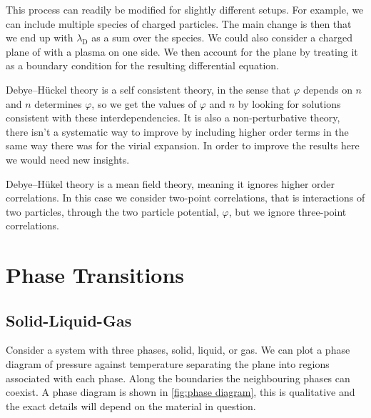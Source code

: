 \documentclass[fleqn]{NotesClass}
\begin{document}
    This process can readily be modified for slightly different setups.
    For example, we can include multiple species of charged particles.
    The main change is then that we end up with \(\lambda_{\mathrm{D}}\) as a sum over the species.
    We could also consider a charged plane of with a plasma on one side.
    We then account for the plane by treating it as a boundary condition for the resulting differential equation.
    
    Debye--H\"uckel theory is a self consistent theory, in the sense that \(\varphi\) depends on \(n\) and \(n\) determines \(\varphi\), so we get the values of \(\varphi\) and \(n\) by looking for solutions consistent with these interdependencies.
    It is also a non-perturbative theory, there isn't a systematic way to improve by including higher order terms in the same way there was for the virial expansion.
    In order to improve the results here we would need new insights.
    
    Debye--H\"ukel theory is a mean field theory, meaning it ignores higher order correlations.
    In this case we consider two-point correlations, that is interactions of two particles, through the two particle potential, \(\varphi\), but we ignore three-point correlations.
    
    \chapter{Phase Transitions}
    \section{Solid-Liquid-Gas}
    Consider a system with three phases, solid, liquid, or gas.
    We can plot a phase diagram of pressure against temperature separating the plane into regions associated with each phase.
    Along the boundaries the neighbouring phases can coexist.
    A phase diagram is shown in \cref{fig:phase diagram}, this is qualitative and the exact details will depend on the material in question.
    
\end{document}
